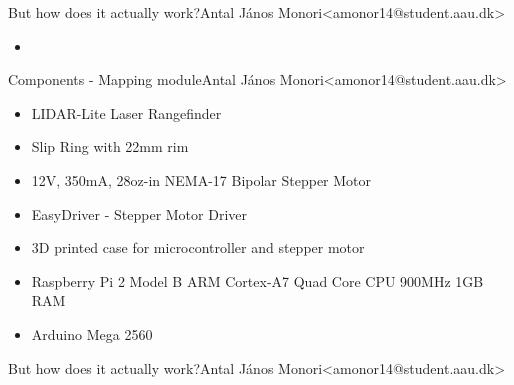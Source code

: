 \begin{frame}{But how does it actually work?}{Antal János Monori\newline<amonor14@student.aau.dk>}
	\begin{itemize}
		\item
	\end{itemize}
\end{frame}

\begin{frame}{Components - Mapping module}{Antal János Monori\newline<amonor14@student.aau.dk>}
	\begin{itemize}
		\item LIDAR-Lite Laser Rangefinder
		\item Slip Ring with 22mm rim
		\item 12V, 350mA, 28oz-in NEMA-17 Bipolar Stepper Motor
		\item EasyDriver - Stepper Motor Driver
		\item 3D printed case for microcontroller and stepper motor
		\item Raspberry Pi 2 Model B ARM Cortex-A7 Quad Core CPU 900MHz 1GB RAM 
		\item Arduino Mega 2560
	\end{itemize}
\end{frame}

\begin{frame}{But how does it actually work?}{Antal János Monori\newline<amonor14@student.aau.dk>}
	
\end{frame}